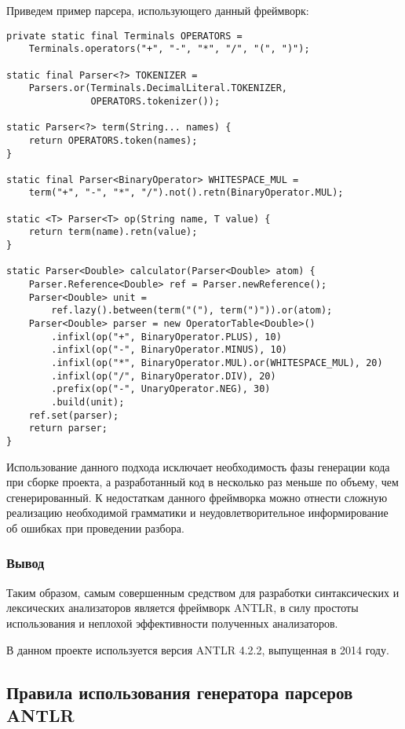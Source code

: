Приведем пример парсера, использующего данный фреймворк:

\newpage
\begin{lstlisting}[caption={Пример парсера, использующего фреймворк Jparsec}]
private static final Terminals OPERATORS =
    Terminals.operators("+", "-", "*", "/", "(", ")");

static final Parser<?> TOKENIZER =
    Parsers.or(Terminals.DecimalLiteral.TOKENIZER,
               OPERATORS.tokenizer());

static Parser<?> term(String... names) {
    return OPERATORS.token(names);
}

static final Parser<BinaryOperator> WHITESPACE_MUL =
    term("+", "-", "*", "/").not().retn(BinaryOperator.MUL);

static <T> Parser<T> op(String name, T value) {
    return term(name).retn(value);
}

static Parser<Double> calculator(Parser<Double> atom) {
    Parser.Reference<Double> ref = Parser.newReference();
    Parser<Double> unit =
        ref.lazy().between(term("("), term(")")).or(atom);
    Parser<Double> parser = new OperatorTable<Double>()
        .infixl(op("+", BinaryOperator.PLUS), 10)
        .infixl(op("-", BinaryOperator.MINUS), 10)
        .infixl(op("*", BinaryOperator.MUL).or(WHITESPACE_MUL), 20)
        .infixl(op("/", BinaryOperator.DIV), 20)
        .prefix(op("-", UnaryOperator.NEG), 30)
        .build(unit);
    ref.set(parser);
    return parser;
}
\end{lstlisting}

Использование данного подхода исключает необходимость фазы генерации кода при
сборке проекта, а разработанный код в несколько раз меньше по объему, чем
сгенерированный. К недостаткам данного фреймворка можно отнести сложную
реализацию необходимой грамматики и неудовлетворительное информирование об
ошибках при проведении разбора.

\subsubsection{Вывод}

Таким образом, самым совершенным средством для разработки синтаксических и
лексических анализаторов является фреймворк ANTLR, в силу простоты использования
и неплохой эффективности полученных анализаторов.

В данном проекте используется версия ANTLR 4.2.2, выпущенная в 2014 году.

\subsection{Правила использования генератора парсеров ANTLR}

